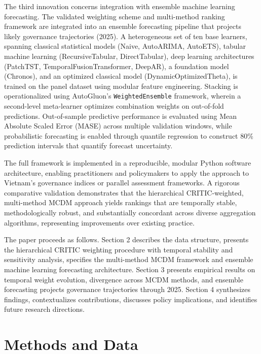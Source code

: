 \documentclass[12pt,a4paper]{article}
\begin{document}
The third innovation concerns integration with ensemble machine learning forecasting. The validated weighting scheme and multi-method ranking framework are integrated into an ensemble forecasting pipeline that projects likely governance trajectories (2025). A heterogeneous set of ten base learners, spanning classical statistical models (Naive, AutoARIMA, AutoETS), tabular machine learning (RecursiveTabular, DirectTabular), deep learning architectures (PatchTST, TemporalFusionTransformer, DeepAR), a foundation model (Chronos), and an optimized classical model (DynamicOptimizedTheta), is trained on the panel dataset using modular feature engineering. Stacking is operationalized using AutoGluon's \texttt{WeightedEnsemble} framework, wherein a second-level meta-learner optimizes combination weights on out-of-fold predictions. Out-of-sample predictive performance is evaluated using Mean Absolute Scaled Error (MASE) across multiple validation windows, while probabilistic forecasting is enabled through quantile regression to construct 80\% prediction intervals that quantify forecast uncertainty.

The full framework is implemented in a reproducible, modular Python software architecture, enabling practitioners and policymakers to apply the approach to Vietnam's governance indices or parallel assessment frameworks. A rigorous comparative validation demonstrates that the hierarchical CRITIC-weighted, multi-method MCDM approach yields rankings that are temporally stable, methodologically robust, and substantially concordant across diverse aggregation algorithms, representing improvements over existing practice.

The paper proceeds as follows. Section 2 describes the data structure, presents the hierarchical CRITIC weighting procedure with temporal stability and sensitivity analysis, specifies the multi-method MCDM framework and ensemble machine learning forecasting architecture. Section 3 presents empirical results on temporal weight evolution, divergence across MCDM methods, and ensemble forecasting projects governance trajectories through 2025. Section 4 synthesizes findings, contextualizes contributions, discusses policy implications, and identifies future research directions.


\section{Methods and Data}
\label{sec:methods}
\end{document}
